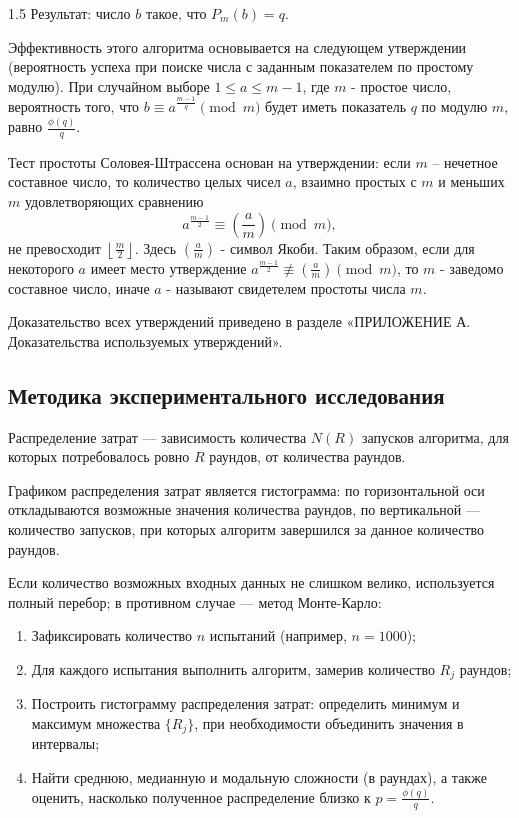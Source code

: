 \documentclass[14pt,a4paper]{extarticle}
\begin{document}
\begin{spacing}{1.5}
Результат: число \(b\) такое, что \(P_m(b) = q\).

Эффективность этого алгоритма основывается на следующем утверждении (вероятность успеха при поиске числа с заданным показателем по простому модулю). При случайном выборе \(1 \le a \le m-1\), где \(m\) - простое число, вероятность того, что \(b \equiv a^{\frac{m-1}{q}} \pmod m\) будет иметь показатель \(q\) по модулю \(m\), равно \(\frac{\phi(q)}{q}\). 

Тест простоты Соловея-Штрассена основан на утверждении: если \(m\) – нечетное составное число, то количество целых чисел \(a\), взаимно простых с \(m\) и меньших \(m\) удовлетворяющих сравнению
\begin{equation}\tag{1.8}
    a^{\frac{m-1}{2}} \equiv \left(\frac{a}{m}\right) \pmod m,
\end{equation}
не превосходит \(\left\lfloor \frac{m}{2} \right\rfloor\). Здесь \(\left(\frac{a}{m}\right)\) - символ Якоби. Таким образом, если для некоторого \(a\) имеет место утверждение \(a^{\frac{m-1}{2}} \not\equiv \left(\frac{a}{m}\right) \pmod m\), то \(m\) - заведомо составное число, иначе \(a\) - называют свидетелем простоты числа \(m\).

Доказательство всех утверждений приведено в разделе «ПРИЛОЖЕНИЕ А. Доказательства используемых утверждений».

\subsection{Методика экспериментального исследования}
Распределение затрат — зависимость количества \(N(R)\) запусков алгоритма, для которых потребовалось ровно \(R\) раундов, от количества раундов.

Графиком распределения затрат является гистограмма: по горизонтальной оси откладываются возможные значения количества раундов, по вертикальной — количество запусков, при которых алгоритм завершился за данное количество раундов.

Если количество возможных входных данных не слишком велико, используется полный перебор; в противном случае — метод Монте-Карло:
\begin{enumerate}
    \item Зафиксировать количество \(n\) испытаний (например, \(n = 1000\));
    \item Для каждого испытания выполнить алгоритм, замерив количество \(R_j\) раундов;
    \item Построить гистограмму распределения затрат: определить минимум и максимум множества \(\{R_j\}\), при необходимости объединить значения в интервалы;
    \item Найти среднюю, медианную и модальную сложности (в раундах), а также оценить, насколько полученное распределение близко к \(p = \frac{\phi(q)}{q}\).
\end{enumerate}


\end{spacing}
\end{document}
